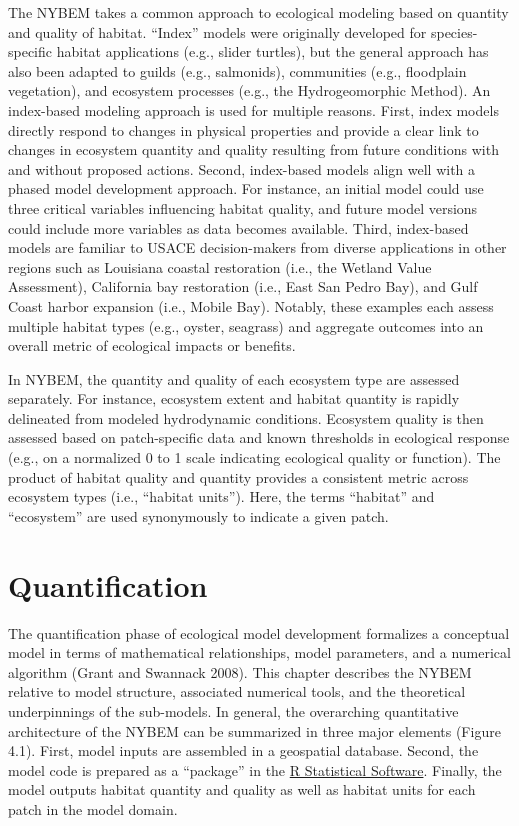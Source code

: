 \documentclass[
]{book}
\begin{document}
The NYBEM takes a common approach to ecological modeling based on quantity and quality of habitat. ``Index'' models \citep{swannack_ecological_2012} were originally developed for species-specific habitat applications (e.g., slider turtles), but the general approach has also been adapted to guilds (e.g., salmonids), communities (e.g., floodplain vegetation), and ecosystem processes (e.g., the Hydrogeomorphic Method). An index-based modeling approach is used for multiple reasons. First, index models directly respond to changes in physical properties and provide a clear link to changes in ecosystem quantity and quality resulting from future conditions with and without proposed actions. Second, index-based models align well with a phased model development approach. For instance, an initial model could use three critical variables influencing habitat quality, and future model versions could include more variables as data becomes available. Third, index-based models are familiar to USACE decision-makers from diverse applications in other regions such as Louisiana coastal restoration (i.e., the Wetland Value Assessment), California bay restoration (i.e., East San Pedro Bay), and Gulf Coast harbor expansion (i.e., Mobile Bay). Notably, these examples each assess multiple habitat types (e.g., oyster, seagrass) and aggregate outcomes into an overall metric of ecological impacts or benefits.

In NYBEM, the quantity and quality of each ecosystem type are assessed separately. For instance, ecosystem extent and habitat quantity is rapidly delineated from modeled hydrodynamic conditions. Ecosystem quality is then assessed based on patch-specific data and known thresholds in ecological response (e.g., on a normalized 0 to 1 scale indicating ecological quality or function). The product of habitat quality and quantity provides a consistent metric across ecosystem types (i.e., ``habitat units''). Here, the terms ``habitat'' and ``ecosystem'' are used synonymously to indicate a given patch.

\hypertarget{quantification}{%
\chapter{Quantification}\label{quantification}}

The quantification phase of ecological model development formalizes a conceptual model in terms of mathematical relationships, model parameters, and a numerical algorithm (Grant and Swannack 2008). This chapter describes the NYBEM relative to model structure, associated numerical tools, and the theoretical underpinnings of the sub-models. In general, the overarching quantitative architecture of the NYBEM can be summarized in three major elements (Figure 4.1). First, model inputs are assembled in a geospatial database. Second, the model code is prepared as a ``package'' in the \href{https://cran.r-project.org/}{R Statistical Software}. Finally, the model outputs habitat quantity and quality as well as habitat units for each patch in the model domain.
\end{document}
